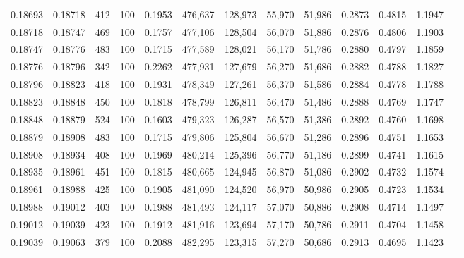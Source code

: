 \begin{tabular}{rrrrrrrrrrrrr}
0.18693 & 0.18718 &   412 & 100 &                                     0.1953 & 476,637 & 128,973 &  55,970 &  51,986 & 0.2873 & 0.4815 & 1.1947 \\
0.18718 & 0.18747 &   469 & 100 &                                     0.1757 & 477,106 & 128,504 &  56,070 &  51,886 & 0.2876 & 0.4806 & 1.1903 \\
0.18747 & 0.18776 &   483 & 100 &                                     0.1715 & 477,589 & 128,021 &  56,170 &  51,786 & 0.2880 & 0.4797 & 1.1859 \\
0.18776 & 0.18796 &   342 & 100 &                                     0.2262 & 477,931 & 127,679 &  56,270 &  51,686 & 0.2882 & 0.4788 & 1.1827 \\
0.18796 & 0.18823 &   418 & 100 &                                     0.1931 & 478,349 & 127,261 &  56,370 &  51,586 & 0.2884 & 0.4778 & 1.1788 \\
0.18823 & 0.18848 &   450 & 100 &                                     0.1818 & 478,799 & 126,811 &  56,470 &  51,486 & 0.2888 & 0.4769 & 1.1747 \\
0.18848 & 0.18879 &   524 & 100 &                                     0.1603 & 479,323 & 126,287 &  56,570 &  51,386 & 0.2892 & 0.4760 & 1.1698 \\
0.18879 & 0.18908 &   483 & 100 &                                     0.1715 & 479,806 & 125,804 &  56,670 &  51,286 & 0.2896 & 0.4751 & 1.1653 \\
0.18908 & 0.18934 &   408 & 100 &                                     0.1969 & 480,214 & 125,396 &  56,770 &  51,186 & 0.2899 & 0.4741 & 1.1615 \\
0.18935 & 0.18961 &   451 & 100 &                                     0.1815 & 480,665 & 124,945 &  56,870 &  51,086 & 0.2902 & 0.4732 & 1.1574 \\
0.18961 & 0.18988 &   425 & 100 &                                     0.1905 & 481,090 & 124,520 &  56,970 &  50,986 & 0.2905 & 0.4723 & 1.1534 \\
0.18988 & 0.19012 &   403 & 100 &                                     0.1988 & 481,493 & 124,117 &  57,070 &  50,886 & 0.2908 & 0.4714 & 1.1497 \\
0.19012 & 0.19039 &   423 & 100 &                                     0.1912 & 481,916 & 123,694 &  57,170 &  50,786 & 0.2911 & 0.4704 & 1.1458 \\
0.19039 & 0.19063 &   379 & 100 &                                     0.2088 & 482,295 & 123,315 &  57,270 &  50,686 & 0.2913 & 0.4695 & 1.1423 \\

\end{tabular}
